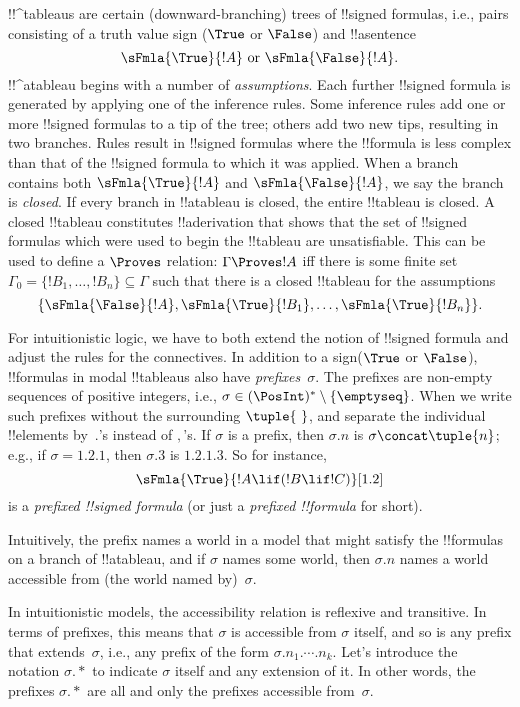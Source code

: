 \documentclass[../../../../include/open-logic-section]{subfiles}
\begin{document}


!!^{tableau}s are certain (downward-branching) trees of !!{signed
  formula}s, i.e., pairs consisting of a truth value sign ($\True$ or
$\False$) and !!a{sentence}
\[
\sFmla{\True}{!A} \text{ or } \sFmla{\False}{!A}.
\]
!!^a{tableau} begins with a number of \emph{assumptions}. Each further
!!{signed formula} is generated by applying one of the inference
rules. Some inference rules add one or more !!{signed formula}s to a
tip of the tree; others add two new tips, resulting in two branches.
Rules result in !!{signed formula}s where the !!{formula} is
less complex than that of the !!{signed formula} to which it was
applied. When a branch contains both $\sFmla{\True}{!A}$ and
$\sFmla{\False}{!A}$, we say the branch is \emph{closed}. If every
branch in !!a{tableau} is closed, the entire !!{tableau} is closed. A
closed !!{tableau} constitutes !!a{derivation} that shows that the set
of !!{signed formula}s which were used to begin the !!{tableau} are
unsatisfiable.  This can be used to define a $\Proves$ relation:
$\Gamma \Proves !A$ iff there is some finite set~$\Gamma_0 = \{!B_1,
\dots, !B_n\} \subseteq \Gamma$ such that there is a closed
!!{tableau} for the assumptions
\[
\{\sFmla{\False}{!A}, \sFmla{\True}{!B_1}, \dots, \sFmla{\True}{!B_n}\}.
\]

For intuitionistic logic, we have to both extend the notion of
!!{signed formula} and adjust the rules for the connectives. In
addition to a sign($\True$ or $\False$), !!{formula}s in modal
!!{tableau}s also have \emph{prefixes}~$\sigma$. The prefixes are
non-empty sequences of positive integers, i.e., $\sigma \in
(\PosInt)^* \setminus \{\emptyseq\}$. When we write such prefixes
without the surrounding $\tuple{\ }$, and separate the individual
!!{element}s by~$.$'s instead of $,$'s. If $\sigma$ is a prefix, then
$\sigma.n$ is $\sigma \concat \tuple{n}$; e.g., if $\sigma = 1.2.1$,
then $\sigma.3$ is $1.2.1.3$. So for instance,
\[
\sFmla{\True}{!A \lif (!B \lif !C)}[1.2]
\]
is a \emph{prefixed !!{signed formula}} (or just a \emph{prefixed
  !!{formula}} for short).

Intuitively, the prefix names a world in a model that might satisfy
the !!{formula}s on a branch of !!a{tableau}, and if $\sigma$ names
some world, then $\sigma.n$ names a world accessible from (the world
named by)~$\sigma$.

In intuitionistic models, the accessibility relation is reflexive and
transitive. In terms of prefixes, this means that $\sigma$ is
accessible from $\sigma$ itself, and so is any prefix that
extends~$\sigma$, i.e., any prefix of the form
$\sigma.n_1.\cdots.n_k$. Let's introduce the notation $\sigma.*$ to
indicate $\sigma$ itself and any extension of it. In other words, the
prefixes $\sigma.*$ are all and only the prefixes accessible
from~$\sigma$.
\end{document}
